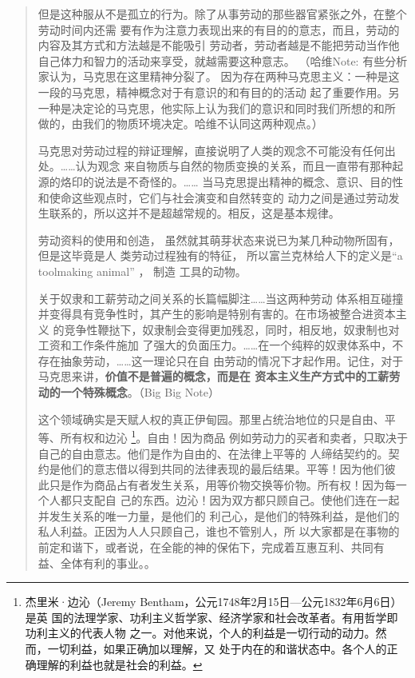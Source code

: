 \begin{quotation}
但是这种服从不是孤立的行为。除了从事劳动的那些器官紧张之外，在整个劳动时间内还需
要有作为注意力表现出来的有目的的意志，而且，劳动的内容及其方式和方法越是不能吸引
劳动者，劳动者越是不能把劳动当作他自己体力和智力的活动来享受，就越需要这种意志。
 （哈维Note: 有些分析家认为，马克思在这里精神分裂了。
因为存在两种马克思主义：一种是这一段的马克思，精神概念对于有意识的和有目的的活动
起了重要作用。另一种是决定论的马克思，他实际上认为我们的意识和同时我们所想的和所
做的，由我们的物质环境决定。哈维不认同这两种观点。）

马克思对劳动过程的辩证理解，直接说明了人类的观念不可能没有任何出处。……认为观念
来自物质与自然的物质变换的关系，而且一直带有那种起源的烙印的说法是不奇怪的。……
当马克思提出精神的概念、意识、目的性和使命这些观点时，它们与社会演变和自然转变的
动力之间是通过劳动发生联系的，所以这并不是超越常规的。相反，这是基本规律。



劳动资料的使用和创造， 虽然就其萌芽状态来说已为某几种动物所固有， 但是这毕竟是人
类劳动过程独有的特征， 所以富兰克林给人下的定义是“a toolmaking animal” ， 制造
工具的动物。

关于奴隶和工薪劳动之间关系的长篇幅脚注……当这两种劳动
体系相互碰撞并变得具有竞争性时，其产生的影响是特别有害的。在市场被整合进资本主义
的竞争性鞭挞下，奴隶制会变得更加残忍，同时，相反地，奴隶制也对工资和工作条件施加
了强大的负面压力。……在一个纯粹的奴隶体系中，不存在抽象劳动，……这一理论只在自
由劳动的情况下才起作用。记住，对于马克思来讲，\textbf{价值不是普遍的概念，而是在
资本主义生产方式中的工薪劳动的一个特殊概念}。（Big Big Note）


这个领域确实是天赋人权的真正伊甸园。那里占统治地位的只是自由、平等、所有权和边沁
\footnote{杰里米·边沁（Jeremy Bentham，公元1748年2月15日—公元1832年6月6日）是英
国的法理学家、功利主义哲学家、经济学家和社会改革者。有用哲学即功利主义的代表人物
之一。对他来说，个人的利益是一切行动的动力。然而，一切利益，如果正确加以理解，又
处于内在的和谐状态中。各个人的正确理解的利益也就是社会的利益。}。自由！因为商品
例如劳动力的买者和卖者，只取决于自己的自由意志。他们是作为自由的、在法律上平等的
人缔结契约的。契约是他们的意志借以得到共同的法律表现的最后结果。平等！因为他们彼
此只是作为商品占有者发生关系，用等价物交换等价物。所有权！因为每一个人都只支配自
己的东西。边沁！因为双方都只顾自己。使他们连在一起并发生关系的唯一力量，是他们的
利己心，是他们的特殊利益，是他们的私人利益。正因为人人只顾自己，谁也不管别人，所
以大家都是在事物的前定和谐下，或者说，在全能的神的保佑下，完成着互惠互利、共同有
益、全体有利的事业。。


\end{quotation}

